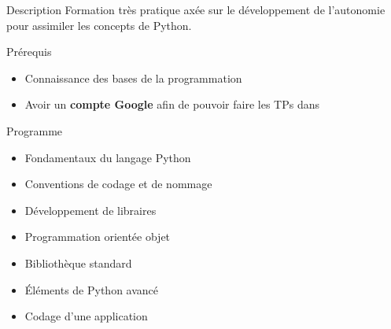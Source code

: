 \begin{frame}{Description}
  Formation très pratique axée sur le développement de l'autonomie pour assimiler les concepts de Python.
\end{frame}

\begin{frame}{Prérequis}
  \begin{itemize}
  \item Connaissance des bases de la programmation
  \item Avoir un \textbf{compte Google} afin de pouvoir faire les TPs dans 
  \end{itemize}
\end{frame}

\begin{frame}{Programme}
  \begin{itemize}
  \item Fondamentaux du langage Python
  \item Conventions de codage et de nommage
  \item Développement de libraires
  \item Programmation orientée objet
  \item Bibliothèque standard
  \item Éléments de Python avancé
  \item Codage d'une application
  \end{itemize}
\end{frame}
